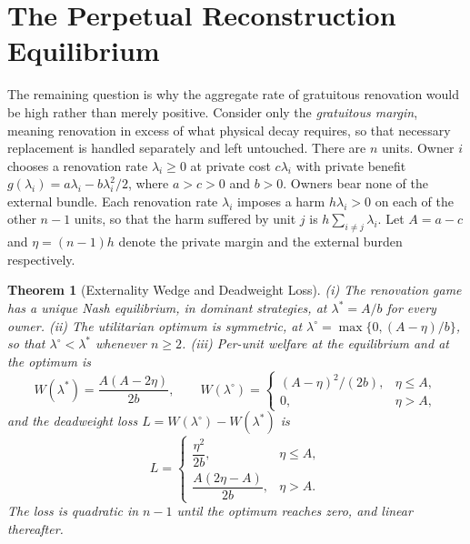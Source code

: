 \documentclass[11pt]{article}
\newtheorem{theorem}{Theorem}[section]
\theoremstyle{definition}
\theoremstyle{remark}
\begin{document}
\section{The Perpetual Reconstruction Equilibrium}\label{sec:equilibrium}

The remaining question is why the aggregate rate of gratuitous renovation would be high rather than merely positive. Consider only the \emph{gratuitous margin}, meaning renovation in excess of what physical decay requires, so that necessary replacement is handled separately and left untouched. There are $n$ units. Owner $i$ chooses a renovation rate $\lambda_i\ge0$ at private cost $c\lambda_i$ with private benefit $g(\lambda_i)=a\lambda_i-b\lambda_i^2/2$, where $a>c>0$ and $b>0$. Owners bear none of the external bundle. Each renovation rate $\lambda_i$ imposes a harm $h\lambda_i>0$ on each of the other $n-1$ units, so that the harm suffered by unit $j$ is $h\sum_{i\ne j}\lambda_i$. Let $A=a-c$ and $\eta=(n-1)h$ denote the private margin and the external burden respectively.

\begin{theorem}[Externality Wedge and Deadweight Loss]\label{thm:wedge}
(i) The renovation game has a unique Nash equilibrium, in dominant strategies, at $\lambda^* = A/b$ for every owner. (ii) The utilitarian optimum is symmetric, at $\lambda^\circ = \max\{0,(A-\eta)/b\}$, so that $\lambda^\circ<\lambda^*$ whenever $n\ge2$. (iii) Per-unit welfare at the equilibrium and at the optimum is
\[
W(\lambda^*) = \frac{A(A-2\eta)}{2b}, \qquad W(\lambda^\circ) = \begin{cases}(A-\eta)^2/(2b), & \eta\le A,\\ 0, & \eta>A,\end{cases}
\]
and the deadweight loss $L=W(\lambda^\circ)-W(\lambda^*)$ is
\begin{equation}\label{eq:loss}
L = \begin{cases}\dfrac{\eta^2}{2b}, & \eta\le A,\\[1.2ex] \dfrac{A(2\eta-A)}{2b}, & \eta>A.\end{cases}
\end{equation}
The loss is quadratic in $n-1$ until the optimum reaches zero, and linear thereafter.
\end{theorem}
\end{document}
